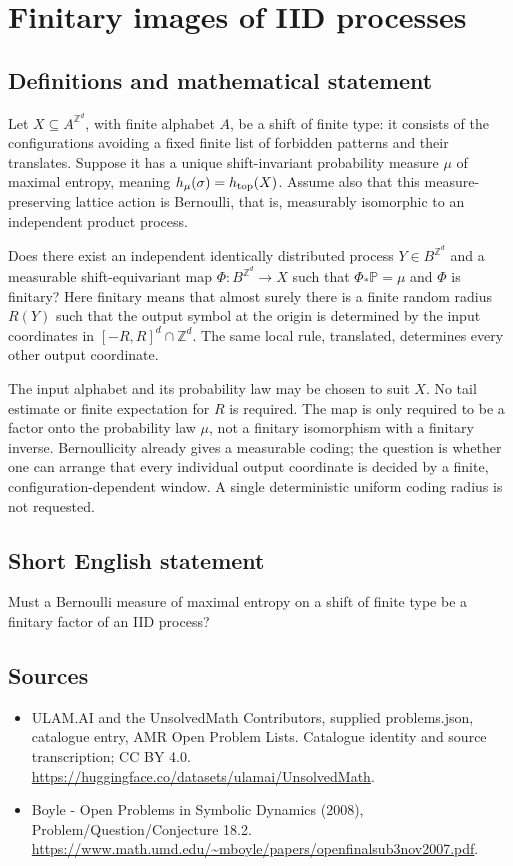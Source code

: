 \documentclass[11pt,a4paper]{article}
\begin{document}
\section*{Finitary images of IID processes}\label{statement}

\subsection{Definitions and mathematical statement}
Let $X\subseteq A^{\mathbb Z^d}$, with finite alphabet $A$, be a shift of
finite type: it consists of the configurations avoiding a fixed finite
list of forbidden patterns and their translates. Suppose it has a unique
shift-invariant probability measure $\mu$ of maximal entropy, meaning
$h_\mu(\sigma)=h_{\rm top}(X)$. Assume also that this measure-preserving
lattice action is Bernoulli, that is, measurably isomorphic to an
independent product process.

Does there exist an independent identically distributed process
$Y\in B^{\mathbb Z^d}$ and a measurable shift-equivariant map
$\Phi:B^{\mathbb Z^d}\to X$ such that $\Phi_*\mathbb P=\mu$ and
$\Phi$ is finitary? Here finitary means that almost surely there is a
finite random radius $R(Y)$ such that the output symbol at the origin
is determined by the input coordinates in $[-R,R]^d\cap\mathbb Z^d$.
The same local rule, translated, determines every other output coordinate.

The input alphabet and its probability law may be chosen to suit $X$.
No tail estimate or finite expectation for $R$ is required. The map is
only required to be a factor onto the probability law $\mu$, not a
finitary isomorphism with a finitary inverse. Bernoullicity already gives
a measurable coding; the question is whether one can arrange that every
individual output coordinate is decided by a finite, configuration-dependent
window. A single deterministic uniform coding radius is not requested.
\subsection{Short English statement}
Must a Bernoulli measure of maximal entropy on a shift of finite type be a finitary factor of an IID process?
\subsection{Sources}
\begin{itemize}
\item[S1] ULAM.AI and the UnsolvedMath Contributors, supplied problems.json, catalogue entry, AMR Open Problem Lists. Catalogue identity and source transcription; CC BY 4.0.
\url{https://huggingface.co/datasets/ulamai/UnsolvedMath}.
\item[S2] Boyle - Open Problems in Symbolic Dynamics (2008), Problem/Question/Conjecture 18.2. 
\url{https://www.math.umd.edu/~mboyle/papers/openfinalsub3nov2007.pdf}.
\end{itemize}
\end{document}
